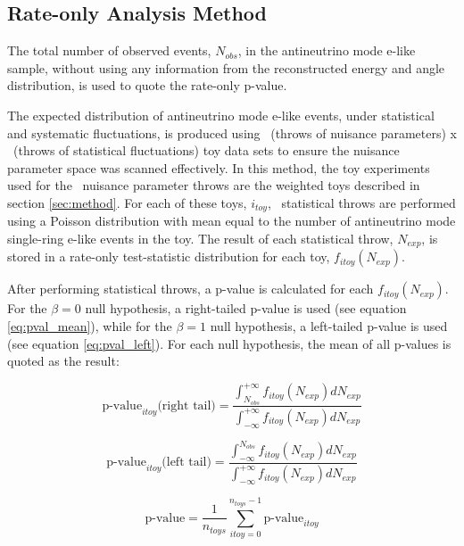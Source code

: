 \subsection{Rate-only Analysis Method}
\label{sec:method_rate-only}

The total number of observed events, $N_{obs}$, in the antineutrino mode e-like sample, without using any information from the reconstructed energy and angle distribution, is used to quote the rate-only p-value. 

The expected distribution of antineutrino mode e-like events, under statistical and systematic fluctuations, is produced using \NToysFakeDataRateOnly\ (throws of nuisance parameters) x \NStatThrows\ (throws of statistical fluctuations) toy data sets to ensure the nuisance parameter space was scanned effectively. In this method, the toy experiments used for the \NToysFakeDataRateOnly\ nuisance parameter throws are the weighted toys described in section \ref{sec:method}. For each of these toys, $i_{toy}$, \NStatThrows\ statistical throws are performed using a Poisson distribution with mean equal to the number of antineutrino mode single-ring e-like events in the toy. The result of each statistical throw, $N_{exp}$, is stored in a rate-only test-statistic distribution for each toy, $f_{itoy} \left( N_{exp} \right)$. 

After performing statistical throws, a p-value is calculated for each $f_{itoy} \left( N_{exp} \right)$. For the $\beta = 0$ null hypothesis, a right-tailed p-value is used (see equation \ref{eq:pval_mean}), while for the $\beta = 1$ null hypothesis, a left-tailed p-value is used (see equation \ref{eq:pval_left}). For each null hypothesis, the mean of all p-values is quoted as the result:

\begin{equation} \label{eq:pval_right}
\textrm{p-value}_{itoy} \textrm{(right tail)} = 
\frac{\int_{N_{obs}}^{+\infty} f_{itoy} \left( N_{exp} \right) dN_{exp}}{ \int_{-\infty}^{+\infty} f_{itoy} \left( N_{exp} \right) dN_{exp}}
\end{equation}

\begin{equation} \label{eq:pval_left}
\textrm{p-value}_{itoy} \textrm{(left tail)} = 
\frac{\int^{N_{obs}}_{-\infty} f_{itoy} \left( N_{exp} \right) dN_{exp}}{ \int_{-\infty}^{+\infty} f_{itoy} \left( N_{exp} \right) dN_{exp}}
\end{equation}

\begin{equation} \label{eq:pval_mean}
\textrm{p-value} = \frac{1}{n_{toys}} \sum_{itoy = 0}^{n_{toys}-1} \textrm{p-value}_{itoy}
\end{equation}

